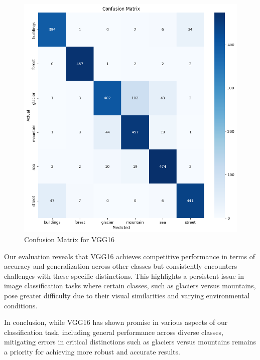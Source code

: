 \documentclass[conference]{IEEEtran}
\begin{document}
\begin{figure}[H]
    \centering
    \includegraphics[width=1\linewidth]{images//VGG16/ConfusionMatrixVGG16.png}
    \caption{Confusion Matrix for VGG16}
    \label{fig:CM_VGG16}
\end{figure}

Our evaluation reveals that VGG16 achieves competitive performance in terms of accuracy and generalization across other classes but consistently encounters challenges with these specific distinctions. This highlights a persistent issue in image classification tasks where certain classes, such as glaciers versus mountains, pose greater difficulty due to their visual similarities and varying environmental conditions.

In conclusion, while VGG16 has shown promise in various aspects of our classification task, including general performance across diverse classes, mitigating errors in critical distinctions such as glaciers versus mountains remains a priority for achieving more robust and accurate results.
\end{document}
